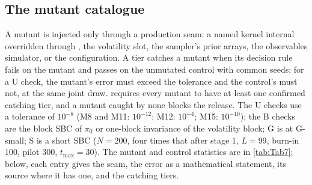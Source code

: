 \subsection{The mutant catalogue}\label{app:mutants}

A mutant is injected only through a production seam: a named kernel internal overridden through
, the volatility slot, the sampler's prior arrays, the
observables simulator, or the configuration.
A tier catches a mutant when its decision rule fails on the mutant and passes on the unmutated
control with common seeds; for a U check, the mutant's error must exceed the tolerance and the
control's must not, at the same joint draw.
 requires every mutant to have at least one confirmed catching tier, and a
mutant caught by none blocks the release.
The U checks use a tolerance of $10^{-8}$ (M8 and M11: $10^{-12}$; M12: $10^{-4}$; M15:
$10^{-10}$); the B checks are the block SBC of $\pi_0$ or one-block invariance of the volatility
block; G is  at G-small; S is a short SBC ($N = 200$, four times that after
stage 1, $L = 99$, burn-in 100, pilot 300, $t_{\max} = 30$).
The mutant and control statistics are in \cref{tab:Tab7}; below, each entry gives the seam,
the error as a mathematical statement, its source where it has one, and the catching tiers.
